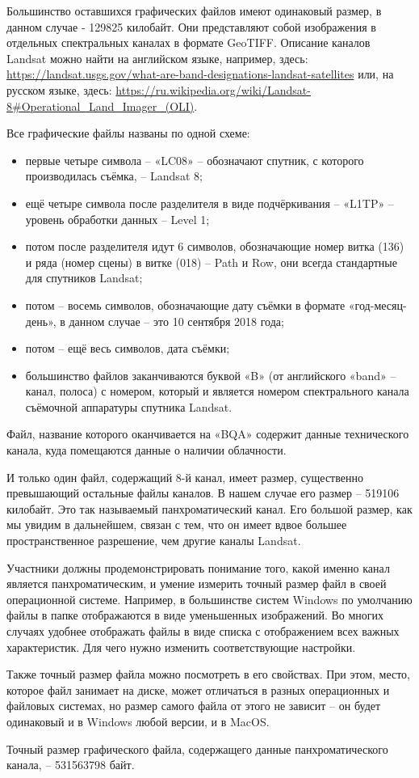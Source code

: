 Большинство оставшихся графических файлов имеют одинаковый размер, в данном случае - 129825 килобайт. Они представляют собой изображения в отдельных спектральных каналах в формате GeoTIFF. Описание каналов Landsat можно найти на английском языке, например, здесь: \url{https://landsat.usgs.gov/what-are-band-designations-landsat-satellites} или, на русском языке, здесь: \url{https://ru.wikipedia.org/wiki/Landsat-8#Operational_Land_Imager_(OLI)}.

Все графические файлы названы по одной схеме:
\begin{itemize}
    \item первые четыре символа – «LC08» – обозначают спутник, с которого производилась съёмка, – Landsat 8;
    \item ещё четыре символа после разделителя в виде подчёркивания – «L1TP» – уровень обработки данных – Level 1;
    \item потом после разделителя идут 6 символов, обозначающие номер витка (136) и ряда (номер сцены) в витке (018) – Path и Row, они всегда стандартные для спутников Landsat;
    \item потом – восемь символов, обозначающие дату съёмки в формате «год-месяц-день», в данном случае – это 10 сентября 2018 года;
    \item потом – ещё весь символов, дата съёмки;
    \item большинство файлов заканчиваются буквой «B» (от английского «band» – канал, полоса) с номером, который и является номером спектрального канала съёмочной аппаратуры спутника Landsat.
\end{itemize}

Файл, название которого оканчивается на «BQA» содержит данные технического канала, куда помещаются данные о наличии облачности.

И только один файл, содержащий 8-й канал, имеет размер, существенно превышающий остальные файлы каналов. В нашем случае его размер – 519106 килобайт. Это так называемый панхроматический канал. Его большой размер, как мы увидим в дальнейшем, связан с тем, что он имеет вдвое большее пространственное разрешение, чем другие каналы Landsat.

Участники должны продемонстрировать понимание  того, какой именно канал является панхроматическим, и умение измерить точный размер файл в своей операционной системе. Например, в большинстве систем Windows по умолчанию файлы в папке отображаются в виде уменьшенных изображений. Во многих случаях удобнее отображать файлы в виде списка с отображением всех важных характеристик. Для чего нужно изменить соответствующие настройки.

Также точный размер файла можно посмотреть в его свойствах. При этом, место, которое файл занимает на диске, может отличаться в разных операционных и файловых системах, но размер самого файла от этого не зависит – он будет одинаковый и в Windows любой версии, и в MacOS.

Точный размер графического файла, содержащего данные панхроматического канала, – 531563798 байт.


